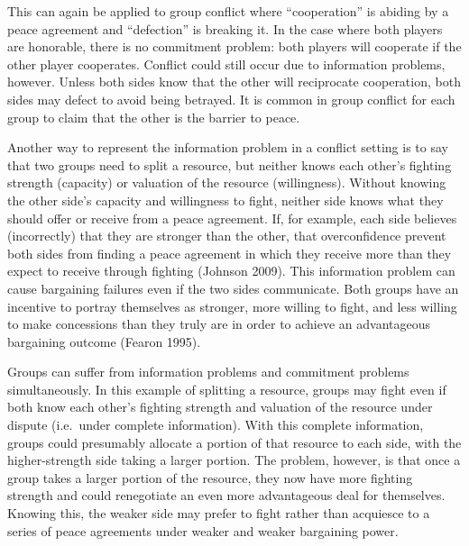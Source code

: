 \documentclass[11pt]{article}
\begin{document}
This can again be applied to group conflict where ``cooperation'' is
abiding by a peace agreement and ``defection'' is breaking it. In the
case where both players are honorable, there is no commitment problem:
both players will cooperate if the other player cooperates. Conflict
could still occur due to information problems, however. Unless both
sides know that the other will reciprocate cooperation, both sides may
defect to avoid being betrayed. It is common in group conflict for each
group to claim that the other is the barrier to peace.

Another way to represent the information problem in a conflict setting
is to say that two groups need to split a resource, but neither knows
each other's fighting strength (capacity) or valuation of the resource
(willingness). Without knowing the other side's capacity and willingness
to fight, neither side knows what they should offer or receive from a
peace agreement. If, for example, each side believes (incorrectly) that
they are stronger than the other, that overconfidence prevent both sides
from finding a peace agreement in which they receive more than they
expect to receive through fighting (Johnson 2009). This information
problem can cause bargaining failures even if the two sides communicate.
Both groups have an incentive to portray themselves as stronger, more
willing to fight, and less willing to make concessions than they truly
are in order to achieve an advantageous bargaining outcome (Fearon
1995).

Groups can suffer from information problems and commitment problems
simultaneously. In this example of splitting a resource, groups may
fight even if both know each other's fighting strength and valuation of
the resource under dispute (i.e.~under complete information). With this
complete information, groups could presumably allocate a portion of that
resource to each side, with the higher-strength side taking a larger
portion. The problem, however, is that once a group takes a larger
portion of the resource, they now have more fighting strength and could
renegotiate an even more advantageous deal for themselves. Knowing this,
the weaker side may prefer to fight rather than acquiesce to a series of
peace agreements under weaker and weaker bargaining power.\newline
\end{document}
